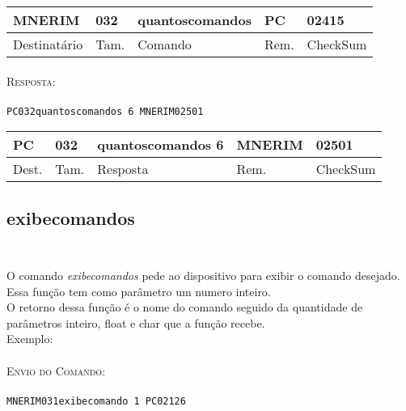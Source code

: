 \documentclass[11pt,	 papera4]{article}
\begin{document}
\begin{table}[h]
	\centering
	\begin{tabular}{p{2cm}p{1cm}p{3cm}p{1cm}p{2cm}}
		\toprule
		MNERIM & 032 & quantoscomandos & PC & 02415 \\
		\midrule	
		Destinatário & Tam. & Comando & Rem. &CheckSum \\
		\bottomrule
	\end{tabular}
	\label{tab:formatoslatex} %
\end{table}
\paragraph*{\newline\newline}
\hspace*{0.8cm}\textsc{Resposta:} \\\\ \hspace*{2cm}\texttt{PC032quantoscomandos 6 MNERIM02501
} 

\begin{table}[h]
	\centering
	\begin{tabular}{p{1cm}p{1cm}p{3cm}p{2cm}p{2cm}}
		\toprule
		PC & 032 & quantoscomandos 6  & MNERIM & 02501 \\
		\midrule	
		Dest. & Tam. & Resposta & Rem. & CheckSum \\
		\bottomrule
	\end{tabular}
	\label{tab:formatoslatex} %
\end{table}

\newpage
\subsection*{exibecomandos \\\\}
O comando \textit{exibecomandos} pede ao dispositivo para exibir o comando desejado. 
Essa função tem como parâmetro um numero inteiro.\\ O retorno dessa função é o nome do comando seguido da quantidade de parâmetros inteiro, float e char que a função recebe.\\
\newline
Exemplo:\\\\ \hspace*{0.5cm} 
\textsc{Envio do Comando:} \\\\ \hspace*{2cm} \texttt{MNERIM031exibecomando 1 PC02126} \\
\end{document}
